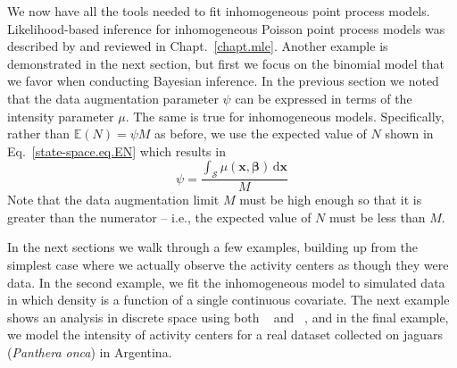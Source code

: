 We now have all the tools needed to fit inhomogeneous point process
models. Likelihood-based inference for inhomogeneous Poisson point
process models was described by \citet{borchers_efford:2008} and
reviewed in Chapt.~\ref{chapt.mle}. Another example is demonstrated in
the next section, but first we focus on the binomial
model that we favor when conducting Bayesian inference. In the
previous section we noted that the data augmentation parameter $\psi$
can be expressed in terms of the intensity parameter $\mu$. The same
is true for inhomogeneous models. Specifically, rather than
$\mathbb{E}(N) = \psi M$ as before, we use the expected value of $N$ shown
in Eq.~\ref{state-space.eq.EN} which results in
\begin{equation}
\psi = \frac{\int_{\mathcal{S}} \mu(\mathbf{x},
  \bm{\beta}) \, \mathrm{d}\mathbf{x}}{M}
\label{state-space.eq.psimu}
\end{equation}
Note that the data augmentation limit $M$ must be high enough so that
it is greater than the numerator -- i.e., the expected value
of $N$ must be less than $M$.

In the next sections we walk through a few examples, building up from
the simplest case where we actually observe the activity centers as
though they were data. In the second example, we fit the inhomogeneous model to simulated
data in which density is a function of a single continuous
covariate.
The next example shows an analysis in discrete space using
both \secr~\citep{efford:2011} and \jags~\citep{plummer:2003}, and in the
final example, we model the intensity of
activity centers for a real dataset collected on jaguars
(\emph{Panthera onca}) in Argentina.

